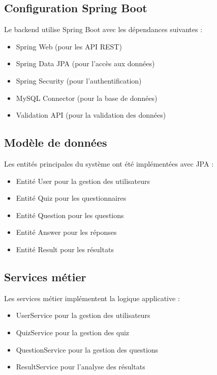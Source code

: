 \documentclass[12pt,a4paper]{report}
\begin{document}
\subsection{Configuration Spring Boot}

Le backend utilise Spring Boot avec les dépendances suivantes :

\begin{itemize}
    \item Spring Web (pour les API REST)
    \item Spring Data JPA (pour l'accès aux données)
    \item Spring Security (pour l'authentification)
    \item MySQL Connector (pour la base de données)
    \item Validation API (pour la validation des données)
\end{itemize}

\subsection{Modèle de données}

Les entités principales du système ont été implémentées avec JPA :

\begin{itemize}
    \item Entité User pour la gestion des utilisateurs
    \item Entité Quiz pour les questionnaires
    \item Entité Question pour les questions
    \item Entité Answer pour les réponses
    \item Entité Result pour les résultats
\end{itemize}

\subsection{Services métier}

Les services métier implémentent la logique applicative :

\begin{itemize}
    \item UserService pour la gestion des utilisateurs
    \item QuizService pour la gestion des quiz
    \item QuestionService pour la gestion des questions
    \item ResultService pour l'analyse des résultats
\end{itemize}
\end{document}
